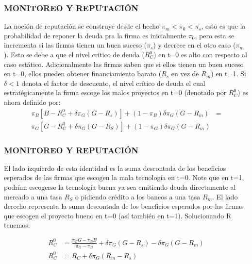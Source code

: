 \begin{frame}
    \frametitle{{\normalsize MONITOREO Y REPUTACIÓN} {}}
    La noción de reputación se construye desde el hecho $\pi_{m}<\pi_{0}<\pi_{s} $, esto es que la probabilidad de reponer la deuda pra la firma es inicialmente $\pi_{0}$, pero esta se incrementa si las firmas tienen un buen suceso ($\pi_{s}$) y decrece en el otro caso ($\pi_{m}$). Esto se debe a que el nivel critico de deuda ($R_{C}^{0} $) en t=0 es alto con respecto al caso estático. Adicionalmente las firmas saben que si ellos tienen un buen suceso en t=0, ellos pueden obtener financiamiento barato ($R_{s} $ en vez de  $ R_{m}$) en t=1. Si $\delta<1$ denota el factor de descuento, el nivel crítico de deuda el cual estratégicamente la firma escoge  los malos proyectos en t=0 (denotado por $R_{C}^{0}$) es ahora definido por:
  \begin{align}
  \pi_{B}\left[B-R_{C}^{0}+\delta\pi_{G}(G-R_{s}) \right]+(1-\pi_{B})\delta \pi_{G}(G-R_{m})&= \nonumber \\
  \pi_{G}\left[G-R_{C}^{0}+\delta\pi_{G}(G-R_{S}) \right]+(1-\pi_{G})\delta \pi_{G}(G-R_{m}) 
  \end{align}  
  
\end{frame}


\begin{frame}
\frametitle{{\normalsize MONITOREO Y REPUTACIÓN} {}}
 
El lado izquierdo de esta identidad es la suma descontada de los beneficios esperados de las firmas que escogen la mala tecnología en t=0. Note que en t=1, podrían escogerse la tecnología buena ya sea emitiendo deuda directamente al mercado a una tasa $R_{S} $ o pidiendo crédito a los bancos a una tasa $R_{m} $. El lado derecho representa la suma descontada de los beneficios esperados por las firmas que escogen el proyecto bueno en t=0 (así también en t=1). Solucionando R tenemos:

\begin{align}
R_{C}^{0}&=\frac{\pi_{G}G-\pi_{B}B}{\pi_{G}-\pi_{B}}+\delta \pi_{G}(G-R_{s})-\delta \pi_{G}(G-R_{m})\nonumber \\
R_{C}^{0}&=R_{C}+\delta \pi_{G}(R_{m}-R_{s})  
\end{align}

\end{frame}

